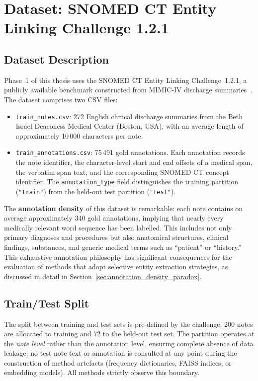 \section{Dataset: SNOMED CT Entity Linking Challenge 1.2.1}

\subsection{Dataset Description}

Phase~1 of this thesis uses the SNOMED CT Entity Linking Challenge~1.2.1, a publicly available benchmark constructed from MIMIC-IV discharge summaries~\cite{Kulyabin:2024}. The dataset comprises two CSV files:

\begin{itemize}
    \item \texttt{train\_notes.csv}: 272 English clinical discharge summaries from the Beth Israel Deaconess Medical Center (Boston, USA), with an average length of approximately 10\,000 characters per note.
    \item \texttt{train\_annotations.csv}: 75\,491 gold annotations. Each annotation records the note identifier, the character-level start and end offsets of a medical span, the verbatim span text, and the corresponding SNOMED CT concept identifier. The \texttt{annotation\_type} field distinguishes the training partition (\texttt{"train"}) from the held-out test partition (\texttt{"test"}).
\end{itemize}

The \textbf{annotation density} of this dataset is remarkable: each note contains on average approximately 340 gold annotations, implying that nearly every medically relevant word sequence has been labelled. This includes not only primary diagnoses and procedures but also anatomical structures, clinical findings, substances, and generic medical terms such as ``patient'' or ``history.'' This exhaustive annotation philosophy has significant consequences for the evaluation of methods that adopt selective entity extraction strategies, as discussed in detail in Section~\ref{sec:annotation_density_paradox}.

\subsection{Train/Test Split}

The split between training and test sets is pre-defined by the challenge: 200 notes are allocated to training and 72 to the held-out test set. The partition operates at the \textit{note level} rather than the annotation level, ensuring complete absence of data leakage: no test note text or annotation is consulted at any point during the construction of method artefacts (frequency dictionaries, FAISS indices, or embedding models). All methods strictly observe this boundary.

